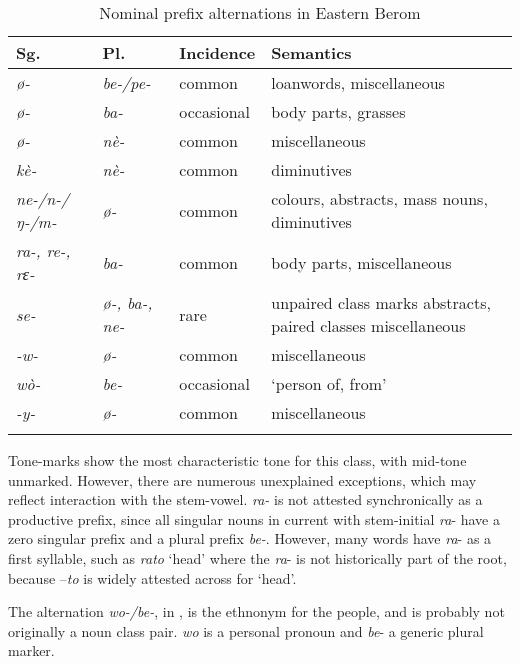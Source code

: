 \documentclass[output=paper]{langsci/langscibook}
\begin{document}
\begin{table}
\caption{Nominal prefix alternations in Eastern Berom}
\label{tab:nomaffplat:4}
\begin{tabularx}{\textwidth}{llL{2cm}Q}
\lsptoprule
  {Sg.} 	&   {Pl.} 	&   Incidence 	&   Semantics \\
  \midrule
\itshape ø- 	& \itshape be-/pe- 	& common 	& loanwords, miscellaneous \\
\tablevspace
\itshape ø- 	& \itshape ba- 	& occasional 	& body parts, grasses \\
\tablevspace
\itshape ø- 	& \itshape nè- 	& common 	& miscellaneous \\
\tablevspace
\itshape kè- 	& \itshape nè- 	& common 	& diminutives \\
\tablevspace
\textit{ne-/n-/ŋ-/m-} 	& \itshape ø- 	& common & colours, abstracts, mass nouns, diminutives  \\
\tablevspace
\itshape *ra-, re-, rɛ- 	& \itshape ba- 	& common 	& body parts, miscellaneous \\
\tablevspace
\itshape se- 	& \itshape ø-, ba-, ne- 	& rare 	& unpaired class marks abstracts, paired classes miscellaneous \\
\tablevspace
\itshape -w- 	& \itshape ø- 	& common 	& miscellaneous \\
\tablevspace
\itshape wò- 	& \itshape be- 	& occasional 	& ‘person of, from’ \\
\tablevspace
\itshape -y- 	& \itshape ø- 	& common  &  miscellaneous \\
\lspbottomrule
\end{tabularx}
\end{table}

\largerpage  
Tone-marks show the most characteristic tone for this class, with mid-tone unmarked. However, there are numerous unexplained exceptions, which may reflect interaction with the stem-vowel. \textit{ra-} is not attested synchronically as a productive prefix, since all singular nouns in current  with stem-initial \textit{ra}- have a zero singular prefix and a plural prefix \textit{be-}. However, many words have \textit{ra}- as a first syllable, such as \textit{rato} ‘head’ where the \textit{ra}- is not historically part of the root, because –\textit{to} is widely attested across  for ‘head’.


The alternation \textit{wo-/be-}, in , is the ethnonym for the  people, and is probably not originally a noun class pair. \textit{wo} is a personal pronoun and \textit{be}- a generic plural marker.
\end{document}
